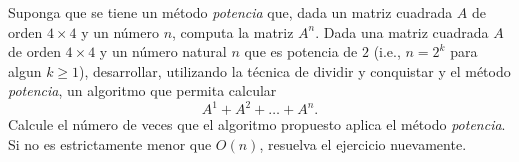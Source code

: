 
Suponga que se tiene un método \emph{potencia} que, dada un matriz cuadrada $A$ de orden $4 \times 4$ y un número $n$, computa la matriz $A^n$.  Dada una matriz cuadrada $A$ de orden $4 \times 4$ y un número natural $n$ que es potencia de $2$ (i.e., $n = 2^k$ para algun $k \geq 1$), desarrollar, utilizando la técnica de dividir y conquistar y el método {\it potencia}, un algoritmo que permita calcular \[ A^1 + A^2 + \ldots + A^n. \]   
Calcule el número de veces que el algoritmo propuesto aplica el método {\it potencia}.  Si no es estrictamente menor que $O(n)$, resuelva el ejercicio nuevamente.
